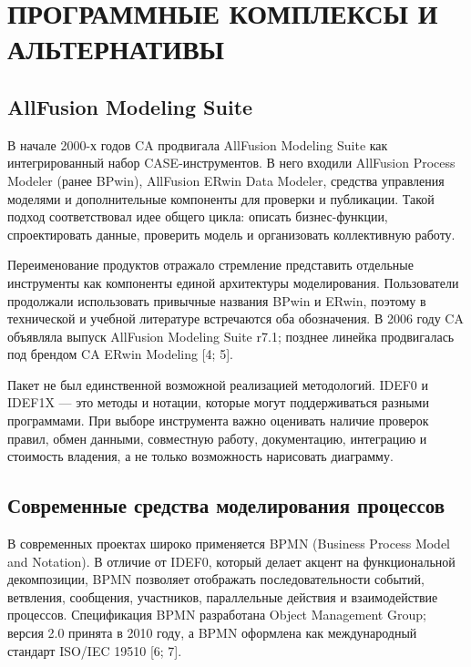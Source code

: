 \documentclass[essaypaper,paper]{pmk-graduate}
\begin{document}
\chapter{ПРОГРАММНЫЕ КОМПЛЕКСЫ И АЛЬТЕРНАТИВЫ}

\section{AllFusion Modeling Suite}

В начале 2000-х годов CA продвигала AllFusion Modeling Suite как интегрированный набор CASE-инструментов. В него входили AllFusion Process Modeler (ранее BPwin), AllFusion ERwin Data Modeler, средства управления моделями и дополнительные компоненты для проверки и публикации. Такой подход соответствовал идее общего цикла: описать бизнес-функции, спроектировать данные, проверить модель и организовать коллективную работу.

\par

Переименование продуктов отражало стремление представить отдельные инструменты как компоненты единой архитектуры моделирования. Пользователи продолжали использовать привычные названия BPwin и ERwin, поэтому в технической и учебной литературе встречаются оба обозначения. В 2006 году CA объявляла выпуск AllFusion Modeling Suite r7.1; позднее линейка продвигалась под брендом CA ERwin Modeling [4; 5].

\par

Пакет не был единственной возможной реализацией методологий. IDEF0 и IDEF1X — это методы и нотации, которые могут поддерживаться разными программами. При выборе инструмента важно оценивать наличие проверок правил, обмен данными, совместную работу, документацию, интеграцию и стоимость владения, а не только возможность нарисовать диаграмму.

\par

\section{Современные средства моделирования процессов}

В современных проектах широко применяется BPMN (Business Process Model and Notation). В отличие от IDEF0, который делает акцент на функциональной декомпозиции, BPMN позволяет отображать последовательности событий, ветвления, сообщения, участников, параллельные действия и взаимодействие процессов. Спецификация BPMN разработана Object Management Group; версия 2.0 принята в 2010 году, а BPMN оформлена как международный стандарт ISO/IEC 19510 [6; 7].
\end{document}
